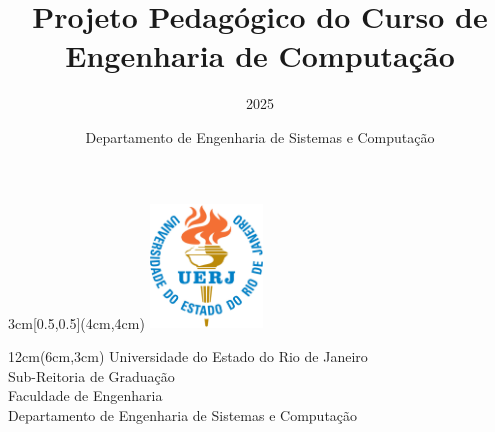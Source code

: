 \documentclass[envcountsame,envcountchap,openany]{svmono}
\begin{document}
\author {Departamento de Engenharia de Sistemas e Computação}

\begin{textblock*}{3cm}[0.5,0.5](4cm,4cm)
	\includegraphics[width=3cm]{imagens/logo_uerj_cor.jpg}
\end{textblock*}
\begin{textblock*}{12cm}(6cm,3cm)   %
	Universidade do Estado do Rio de Janeiro\\
	Sub-Reitoria de Graduação \\
	Faculdade de Engenharia\\
	Departamento de Engenharia de Sistemas e Computação
\end{textblock*}

\title{Projeto Pedagógico do Curso de Engenharia de Computação}
\subtitle{2025}
\date{} 
\maketitle
\pagestyle{empty}
\vfill

\tableofcontents
\listoftables

\frontmatter%

\mainmatter%
\pagestyle{fancy}







%



\backmatter%

\appendix
\appendixpage

\addappheadtotoc
\end{document}
